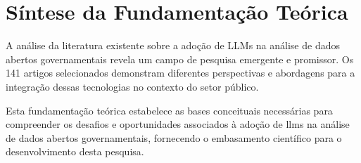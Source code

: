 \section{Síntese da Fundamentação Teórica}

A análise da literatura existente sobre a adoção de LLMs na análise de dados abertos governamentais 
revela um campo de pesquisa emergente e promissor. Os 141 artigos selecionados 
demonstram diferentes perspectivas e abordagens para a integração dessas tecnologias no contexto 
do setor público.

Esta fundamentação teórica estabelece as bases conceituais necessárias para compreender 
os desafios e oportunidades associados à adoção de llms na análise de dados abertos governamentais, 
fornecendo o embasamento científico para o desenvolvimento desta pesquisa.

